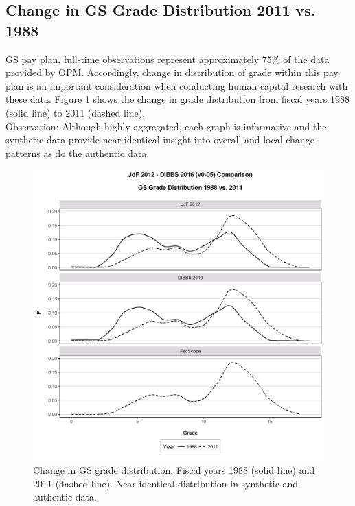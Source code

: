 \documentclass[10pt, letterpaper]{article}
\begin{document}
\begin{spacing}{1.0}
\clearpage

\subsection{Change in GS Grade Distribution 2011 vs. 1988}

GS pay plan, full-time observations represent approximately 75\% of the data provided by OPM.  Accordingly, change in distribution of grade within this pay plan is an important consideration when conducting human capital research with these data.  Figure \ref{figure:GSGradeDistribution1988-2011} shows the change in grade distribution from fiscal years 1988 (solid line) to 2011 (dashed line).\\

Observation:  Although highly aggregated, each graph is informative and the synthetic data provide near identical insight into overall and local change patterns as do the authentic data.\\

\vspace{20pt}

\begin{figure}[h]
    \centering
    \includegraphics[width=6in, trim={0 0.6in 0 0.6in}, clip]{GSGradeDistribution1988-2011.png}
    \caption{Change in GS grade distribution.  Fiscal years 1988 (solid line) and 2011 (dashed line).  Near identical distribution in synthetic and authentic data.}
    \label{figure:GSGradeDistribution1988-2011}
\end{figure}


\end{spacing}
\end{document}
